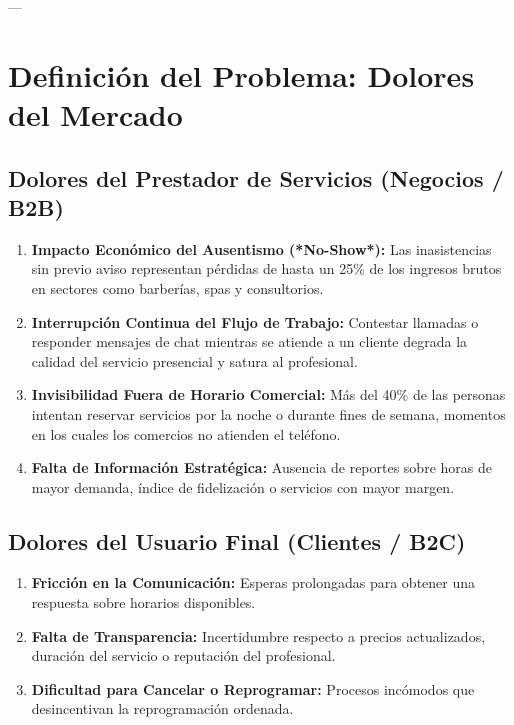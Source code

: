 \documentclass[11pt,a4paper]{article}
\begin{document}
---

\section{Definición del Problema: Dolores del Mercado}

\subsection{Dolores del Prestador de Servicios (Negocios / B2B)}
\begin{enumerate}
    \item \textbf{Impacto Económico del Ausentismo (*No-Show*):} Las inasistencias sin previo aviso representan pérdidas de hasta un 25\% de los ingresos brutos en sectores como barberías, spas y consultorios.
    \item \textbf{Interrupción Continua del Flujo de Trabajo:} Contestar llamadas o responder mensajes de chat mientras se atiende a un cliente degrada la calidad del servicio presencial y satura al profesional.
    \item \textbf{Invisibilidad Fuera de Horario Comercial:} Más del 40\% de las personas intentan reservar servicios por la noche o durante fines de semana, momentos en los cuales los comercios no atienden el teléfono.
    \item \textbf{Falta de Información Estratégica:} Ausencia de reportes sobre horas de mayor demanda, índice de fidelización o servicios con mayor margen.
\end{enumerate}

\subsection{Dolores del Usuario Final (Clientes / B2C)}
\begin{enumerate}
    \item \textbf{Fricción en la Comunicación:} Esperas prolongadas para obtener una respuesta sobre horarios disponibles.
    \item \textbf{Falta de Transparencia:} Incertidumbre respecto a precios actualizados, duración del servicio o reputación del profesional.
    \item \textbf{Dificultad para Cancelar o Reprogramar:} Procesos incómodos que desincentivan la reprogramación ordenada.
\end{enumerate}
\end{document}
